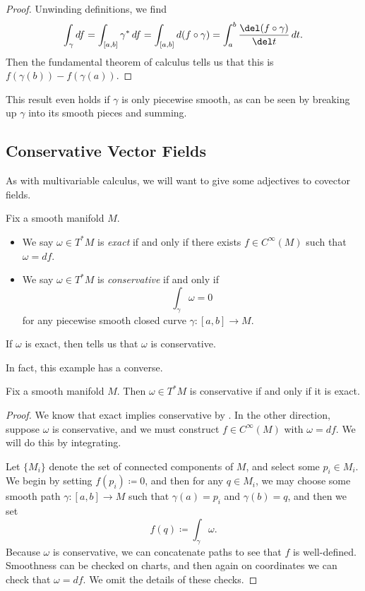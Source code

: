 \documentclass[../notes.tex]{subfiles}
\begin{document}
\begin{proof}
	Unwinding definitions, we find
	\[\int_\gamma df=\int_{[a,b]}\gamma^*\,df=\int_{[a,b]}d(f\circ\gamma)=\int_a^b\frac{\del(f\circ\gamma)}{\del t}\,dt.\]
	Then the fundamental theorem of calculus tells us that this is $f(\gamma(b))-f(\gamma(a))$.
\end{proof}
\begin{remark}
	This result even holds if $\gamma$ is only piecewise smooth, as can be seen by breaking up $\gamma$ into its smooth pieces and summing.
\end{remark}

\subsection{Conservative Vector Fields}
As with multivariable calculus, we will want to give some adjectives to covector fields.
\begin{defihelper}  
	Fix a smooth manifold $M$.
	\begin{itemize}
		\item We say $\omega\in T^*M$ is \textit{exact} if and only if there exists $f\in C^\infty(M)$ such that $\omega=df$.
		\item We say $\omega\in T^*M$ is \textit{conservative} if and only if
		\[\int_\gamma\omega=0\]
		for any piecewise smooth closed curve $\gamma\colon[a,b]\to M$.
	\end{itemize}
\end{defihelper}
\begin{example}
	If $\omega$ is exact, then  tells us that $\omega$ is conservative.
\end{example}
In fact, this example has a converse.
\begin{proposition} \label{prop:conservative-is-exact}
	Fix a smooth manifold $M$. Then $\omega\in T^*M$ is conservative if and only if it is exact.
\end{proposition}
\begin{proof}
	We know that exact implies conservative by . In the other direction, suppose $\omega$ is conservative, and we must construct $f\in C^\infty(M)$ with $\omega=df$. We will do this by integrating.

	Let $\{M_i\}$ denote the set of connected components of $M$, and select some $p_i\in M_i$. We begin by setting $f(p_i)\coloneqq0$, and then for any $q\in M_i$, we may choose some smooth path $\gamma\colon[a,b]\to M$ such that $\gamma(a)=p_i$ and $\gamma(b)=q$, and then we set
	\[f(q)\coloneqq\int_\gamma\omega.\]
	Because $\omega$ is conservative, we can concatenate paths to see that $f$ is well-defined. Smoothness can be checked on charts, and then again on coordinates we can check that $\omega=df$. We omit the details of these checks.
\end{proof}
\end{document}
